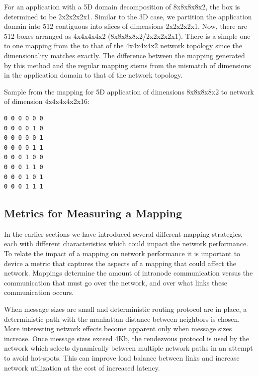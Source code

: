 \documentclass{acm_proc_article-sp}
\begin{document}
For an application with a 5D domain decomposition of 8x8x8x8x2, the box is determined to be 2x2x2x2x1. Similar to the 3D case, we
partition the application domain into 512 contiguous into  slices of dimensions 2x2x2x2x1.
Now, there are 512 boxes arranged as 4x4x4x4x2 (8x8x8x8x2/2x2x2x2x1). There is a simple one to one mapping from the
to that of the 4x4x4x4x2 network topology since the dimensionality matches exactly. The difference between the mapping
generated by this method and the regular mapping stems from the mismatch of dimensions in the application domain to that
of the network topology.

Sample from the mapping for 5D application of dimensions 8x8x8x8x2 to network of dimension 4x4x4x4x2x16:
\begin{lstlisting}[frame=lines, basicstyle=\ttfamily,columns=fixed]
0 0 0 0 0 0
0 0 0 0 1 0
0 0 0 0 0 1
0 0 0 0 1 1
0 0 0 1 0 0
0 0 0 1 1 0
0 0 0 1 0 1
0 0 0 1 1 1
\end{lstlisting}

\subsection{Metrics for Measuring a Mapping}

In the earlier sections we have introduced several different mapping strategies, each with different characteristics which could
impact the network performance. To relate the impact of a mapping on network performance it is important to device a metric that
captures the aspects of a mapping that could affect the network. Mappings determine the amount of intranode communication versus
the communication that must go over the network, and over what links these communication occurs.

When message sizes are small and deterministic routing
protocol are in place, a deterministic path with the manhattan distance
between neighbors is chosen.  More interesting network effects become apparent only when message sizes increase. Once message sizes exceed 4Kb, the
rendezvous protocol is used by the network which selects dynamically between
multiple network paths in an attempt to avoid hot-spots.  This can improve load balance between links and
increase network utilization at the cost of
increased latency.
\end{document}
